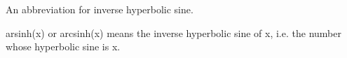 An abbreviation for inverse hyperbolic sine. 
\par
arsinh(x) or arcsinh(x) means the inverse hyperbolic sine of x, i.e. the number
whose hyperbolic sine is x.